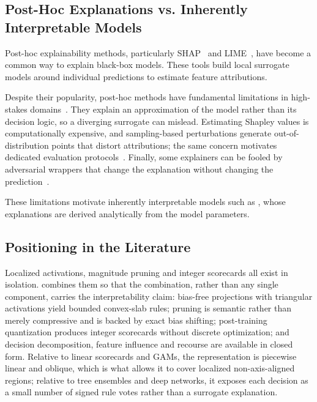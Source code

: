 \subsection{Post-Hoc Explanations vs. Inherently Interpretable Models}
\label{subsec:related_posthoc}

Post-hoc explainability methods, particularly SHAP~\cite{lundberg2017unified} and LIME~\cite{ribeiro2016why}, have become a common way to explain black-box models. These tools build local surrogate models around individual predictions to estimate feature attributions.

Despite their popularity, post-hoc methods have fundamental limitations in
high-stakes domains~\cite{rudin2019stop}. They explain an approximation of the
model rather than its decision logic, so a diverging surrogate can mislead.
Estimating Shapley values is computationally expensive, and sampling-based
perturbations generate out-of-distribution points that distort attributions; the
same concern motivates dedicated evaluation protocols~\cite{nauta2023evaluating}.
Finally, some explainers can be fooled by adversarial wrappers that change the
explanation without changing the prediction~\cite{slack2020fooling}.

These limitations motivate inherently interpretable models such as \modelname{},
whose explanations are derived analytically from the model parameters.

\subsection{Positioning \modelname{} in the Literature}
\label{subsec:related_positioning}

Localized activations, magnitude pruning and integer scorecards all exist in
isolation. \modelname{} combines them so that the combination, rather than any
single component, carries the interpretability claim: bias-free projections with
triangular activations yield bounded convex-slab rules; pruning is semantic rather
than merely compressive and is backed by exact bias shifting; post-training
quantization produces integer scorecards without discrete optimization; and
decision decomposition, feature influence and recourse are available in closed
form. Relative to linear scorecards and GAMs, the representation is piecewise
linear and oblique, which is what allows it to cover localized non-axis-aligned
regions; relative to tree ensembles and deep networks, it exposes each decision as
a small number of signed rule votes rather than a surrogate explanation.
